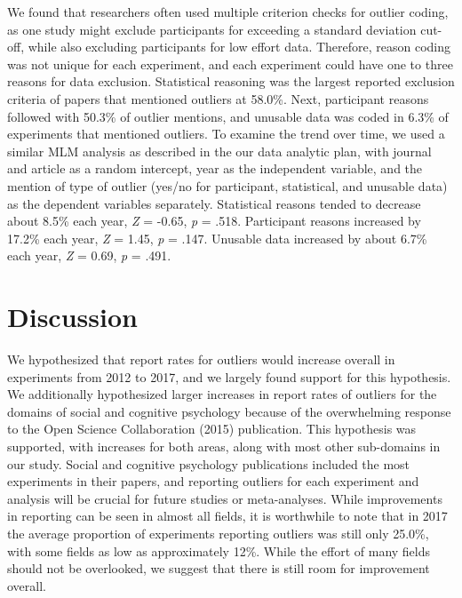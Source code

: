 \documentclass[english,,man]{apa6}
\begin{document}
We found that researchers often used multiple criterion checks for outlier coding, as one study might exclude participants for exceeding a standard deviation cut-off, while also excluding participants for low effort data. Therefore, reason coding was not unique for each experiment, and each experiment could have one to three reasons for data exclusion. Statistical reasoning was the largest reported exclusion criteria of papers that mentioned outliers at 58.0\%. Next, participant reasons followed with 50.3\% of outlier mentions, and unusable data was coded in 6.3\% of experiments that mentioned outliers. To examine the trend over time, we used a similar MLM analysis as described in the our data analytic plan, with journal and article as a random intercept, year as the independent variable, and the mention of type of outlier (yes/no for participant, statistical, and unusable data) as the dependent variables separately. Statistical reasons tended to decrease about 8.5\% each year, \emph{Z} = -0.65, \emph{p} = .518. Participant reasons increased by 17.2\% each year, \emph{Z} = 1.45, \emph{p} = .147. Unusable data increased by about 6.7\% each year, \emph{Z} = 0.69, \emph{p} = .491.

\hypertarget{discussion}{%
\section{Discussion}\label{discussion}}

We hypothesized that report rates for outliers would increase overall in experiments from 2012 to 2017, and we largely found support for this hypothesis. We additionally hypothesized larger increases in report rates of outliers for the domains of social and cognitive psychology because of the overwhelming response to the Open Science Collaboration (2015) publication. This hypothesis was supported, with increases for both areas, along with most other sub-domains in our study. Social and cognitive psychology publications included the most experiments in their papers, and reporting outliers for each experiment and analysis will be crucial for future studies or meta-analyses. While improvements in reporting can be seen in almost all fields, it is worthwhile to note that in 2017 the average proportion of experiments reporting outliers was still only 25.0\%, with some fields as low as approximately 12\%. While the effort of many fields should not be overlooked, we suggest that there is still room for improvement overall.
\end{document}
